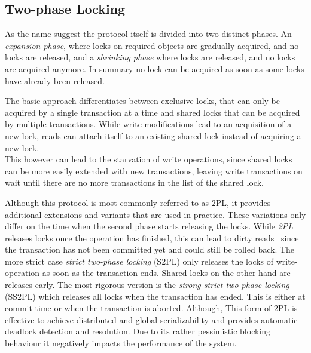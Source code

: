 \subsection{Two-phase Locking}

As the name suggest the protocol itself is divided into two distinct phases. An \emph{expansion phase}, where locks on required objects are gradually acquired, 
and no locks are released, and a \emph{shrinking phase} where locks are released, and no locks are acquired anymore.
In summary no lock can be acquired as soon as some locks have already been released.

The basic approach differentiates between exclusive locks, that can only be acquired by a single transaction at a time and shared locks that 
can be acquired by multiple transactions. While write modifications lead to an acquisition of a new lock, reads can attach itself to an existing shared lock 
instead of acquiring a new lock. \\
This however can lead to the starvation of write operations, since shared locks can be more easily extended with new transactions, leaving write transactions on wait until 
there are no more transactions in the list of the shared lock. 

Although this protocol is most commonly referred to as 2PL, it provides additional extensions and variants that are used in practice. 
These variations only differ on the time when the second phase starts releasing the locks. 
While \emph{2PL} releases locks once the operation has finished, this can lead to dirty 
reads~\cite{}  since the transaction has not been committed yet and could still be rolled back.
The more strict case \emph{strict two-phase locking} (S2PL) only releases the locks of write-operation as soon as the transaction ends.
Shared-locks on the other hand are releases early.
The most rigorous version is the \emph{strong strict two-phase locking} (SS2PL) which releases all locks when the transaction has ended.
This is either at commit time or when the transaction is aborted.
Although, This form of 2PL is effective to achieve distributed and global serializability and provides automatic deadlock detection and resolution.
Due to its rather pessimistic blocking behaviour it negatively impacts the performance of the system.



